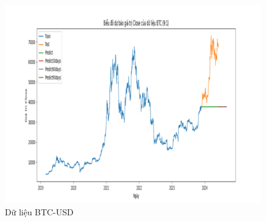 \documentclass[conference]{IEEEtran}
\begin{document}
\begin{figure}[H]
\begin{minipage}{0.15\textwidth}
    \includegraphics[width=1\textwidth]{Figure/ARIMA_BTC_91.png}
    \end{minipage}
    \caption{Dữ liệu BTC-USD}
    \label{fig:1}
\end{figure}
\end{document}
